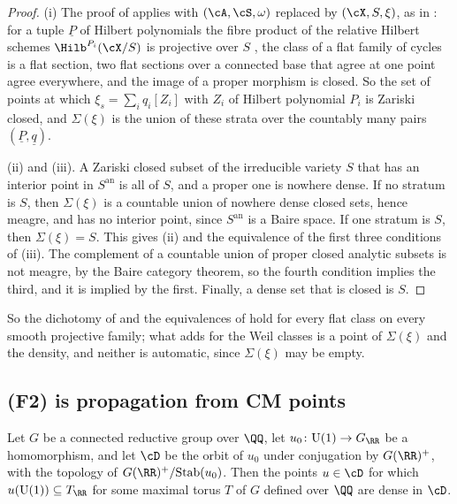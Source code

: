 \begin{proof}
(i) The proof of \cite[Theorem~16.4]{paperI} applies with
$(\cA,\cS,\omega)$ replaced by $(\cX,S,\xi)$, as in :
for a tuple $\underline{P}$ of Hilbert polynomials the fibre product of the
relative Hilbert schemes $\Hilb^{P_{i}}(\cX/S)$ is projective over $S$
\cite{Gro61}, the class of a flat family of cycles is a flat section, two flat
sections over a connected base that agree at one point agree everywhere, and
the image of a proper morphism is closed. So the set of points at which
$\xi_{s}=\sum_{i}q_{i}[Z_{i}]$ with $Z_{i}$ of Hilbert polynomial $P_{i}$ is
Zariski closed, and $\Sigma(\xi)$ is the union of these strata over the
countably many pairs $(\underline{P},\underline{q})$.

(ii) and (iii). A Zariski closed subset of the irreducible variety $S$ that
has an interior point in $S^{\mathrm{an}}$ is all of $S$, and a proper one is
nowhere dense. If no stratum is $S$, then $\Sigma(\xi)$ is a countable union
of nowhere dense closed sets, hence meagre, and has no interior point, since
$S^{\mathrm{an}}$ is a Baire space. If one stratum is $S$, then
$\Sigma(\xi)=S$. This gives (ii) and the equivalence of the first three
conditions of (iii). The complement of a countable union of proper closed
analytic subsets is not meagre, by the Baire category theorem, so the fourth
condition implies the third, and it is implied by the first. Finally, a
dense set that is closed is $S$.
\end{proof}

So the dichotomy of \cite[Theorem~1.1(iii)]{paperI} and the equivalences of
\cite[Theorem~1.1(iv)]{paperI} hold for every flat class on every smooth projective
family; what \cite[Theorem~1.1]{paperI} adds for the Weil classes is a point of
$\Sigma(\xi)$ and the density, and neither is automatic, since
$\Sigma(\xi)$ may be empty.

\subsection{(F2) is propagation from CM points}\label{ssec:f2cm}

\begin{lemma}\label{lem:cmdense}
Let $G$ be a connected reductive group over $\QQ$, let
$u_{0}\colon\mathrm{U}(1)\to G_{\RR}$ be a homomorphism, and let $\cD$ be
the orbit of $u_{0}$ under conjugation by $G(\RR)^{+}$, with the topology of
$G(\RR)^{+}/\mathrm{Stab}(u_{0})$. Then the points $u\in\cD$ for which
$u(\mathrm{U}(1))\subseteq T_{\RR}$ for some maximal torus $T$ of $G$ defined
over $\QQ$ are dense in $\cD$.
\end{lemma}

